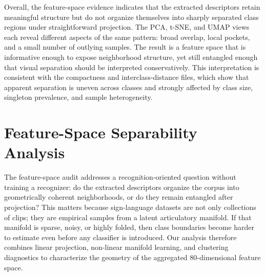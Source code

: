 \documentclass{ieeeaccess}
\begin{document}
Overall, the feature-space evidence indicates that the extracted descriptors retain meaningful structure but do not organize themselves into sharply separated class regions under straightforward projection. The PCA, t-SNE, and UMAP views each reveal different aspects of the same pattern: broad overlap, local pockets, and a small number of outlying samples. The result is a feature space that is informative enough to expose neighborhood structure, yet still entangled enough that visual separation should be interpreted conservatively. This interpretation is consistent with the compactness and interclass-distance files, which show that apparent separation is uneven across classes and strongly affected by class size, singleton prevalence, and sample heterogeneity.

\section{Feature-Space Separability Analysis}
\label{sec:feature_space_separability}

The feature-space audit addresses a recognition-oriented question without training a recognizer: do the extracted descriptors organize the corpus into geometrically coherent neighborhoods, or do they remain entangled after projection? This matters because sign-language datasets are not only collections of clips; they are empirical samples from a latent articulatory manifold. If that manifold is sparse, noisy, or highly folded, then class boundaries become harder to estimate even before any classifier is introduced. Our analysis therefore combines linear projection, non-linear manifold learning, and clustering diagnostics to characterize the geometry of the aggregated 80-dimensional feature space.
\end{document}
